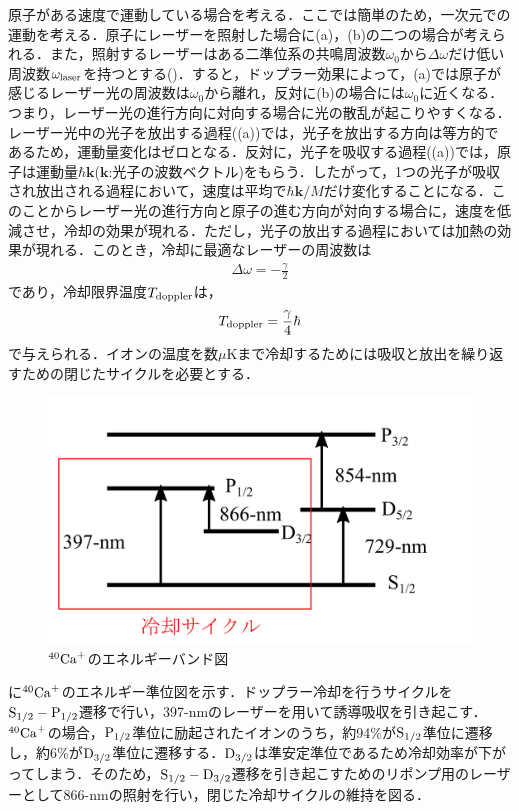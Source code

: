 原子がある速度で運動している場合を考える．ここでは簡単のため，一次元での運動を考える．原子にレーザーを照射した場合に(a)，(b)の二つの場合が考えられる．また，照射するレーザーはある二準位系の共鳴周波数$\omega_0$から$\Delta\omega $だけ低い周波数$\omega_{\rm laser}$を持つとする()．すると，ドップラー効果によって，(a)では原子が感じるレーザー光の周波数は$\omega_0$から離れ，反対に(b)の場合には$\omega_0$に近くなる．つまり，レーザー光の進行方向に対向する場合に光の散乱が起こりやすくなる．レーザー光中の光子を放出する過程((a))では，光子を放出する方向は等方的であるため，運動量変化はゼロとなる．反対に，光子を吸収する過程((a))では，原子は運動量$\hbar \bm{k}$($\bm{k}$:光子の波数ベクトル)をもらう．したがって，1つの光子が吸収され放出される過程において，速度は平均で$\hbar \bm{k}/M$だけ変化することになる．このことからレーザー光の進行方向と原子の進む方向が対向する場合に，速度を低減させ，冷却の効果が現れる．ただし，光子の放出する過程においては加熱の効果が現れる．このとき，冷却に最適なレーザーの周波数は
\large
\begin{align}
\Delta \omega = - \frac{\gamma}{2}
\end{align}
\normalsize
であり，冷却限界温度$T_{\rm doppler}$は，
\large
\begin{align}
T_{\rm doppler} = \frac{\gamma}{4}\hbar
\end{align}
\normalsize
で与えられる．イオンの温度を数$\mu$Kまで冷却するためには吸収と放出を繰り返すための閉じたサイクルを必要とする．

\begin{figure}[h]
	\begin{center}
		\includegraphics[width = 0.6\linewidth]{./theory/figure/Ca+_energy.png}
		\caption{$^{40}{\rm Ca}^+$のエネルギーバンド図}
		\label{fig:Ca+_energy}
	\end{center}
\end{figure}

に$^{40}{\rm Ca}^{+}$のエネルギー準位図を示す．ドップラー冷却を行うサイクルを${\rm S}_{1/2} - {\rm P}_{1/2}$遷移で行い，397-nmのレーザーを用いて誘導吸収を引き起こす．$^{40}{\rm Ca}^{+}$の場合，${\rm P}_{1/2}$準位に励起されたイオンのうち，約94\%が${\rm S}_{1/2}$準位に遷移し，約6\%が${\rm D}_{3/2}$準位に遷移する．${\rm D}_{3/2}$は準安定準位であるため冷却効率が下がってしまう．そのため，${\rm S}_{1/2} - {\rm D}_{3/2}$遷移を引き起こすためのリポンプ用のレーザーとして866-nmの照射を行い，閉じた冷却サイクルの維持を図る．


